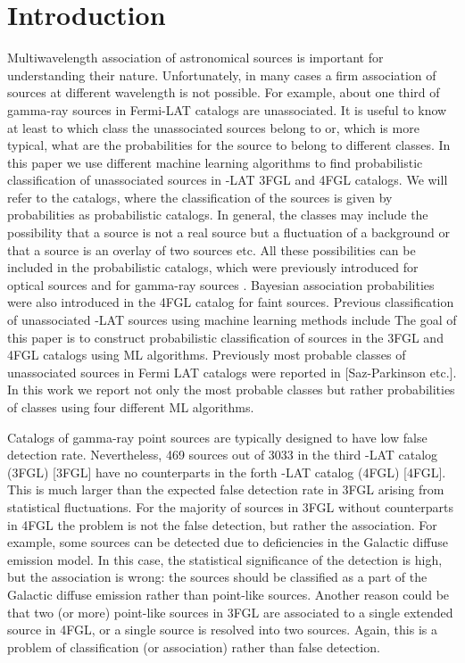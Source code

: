 \section{Introduction}

Multiwavelength association of astronomical sources is important for understanding their nature.
Unfortunately, in many cases a firm association of sources at different wavelength is not possible.
For example, about one third of gamma-ray sources in Fermi-LAT catalogs are unassociated.
It is useful to know at least to which class the unassociated sources belong to or, which is more typical,
what are the probabilities for the source to belong to different classes.
In this paper we use different machine learning algorithms to find probabilistic classification of
unassociated sources in \Fermi-LAT 3FGL \citep{2015ApJS..218...23A} and 4FGL \citep{2020ApJS..247...33A} catalogs.
We will refer to the catalogs, where the classification of the sources is given by probabilities as probabilistic catalogs.
In general, the classes may include the possibility that a source is not a real source but a fluctuation of a background 
or that a source is an overlay of two sources etc.
All these possibilities can be included in the probabilistic catalogs, which were previously introduced for optical sources 
\citep[e.g.,][]{2010EAS....45..351H, 2013AJ....146....7B}
and for gamma-ray sources \citep{2017ApJ...839....4D}.
Bayesian association probabilities were also introduced in the 4FGL catalog \citep{2020ApJS..247...33A} for faint sources.
Previous classification of unassociated \Fermi-LAT sources using machine learning methods include 
The goal of this paper is to construct probabilistic classification of sources in the 3FGL and 4FGL catalogs using ML algorithms.
Previously most probable classes of unassociated sources in Fermi LAT catalogs were reported in
[Saz-Parkinson etc.].
In this work we report not only the most probable classes but rather probabilities of classes using four different ML algorithms.

Catalogs of gamma-ray point sources are typically designed to have low false detection rate. 
Nevertheless, 469 sources out of 3033 in the third \Fermi-LAT catalog (3FGL) [3FGL] have no counterparts 
in the forth \Fermi-LAT catalog (4FGL) [4FGL].
This is much larger than the expected false detection rate in 3FGL arising from statistical fluctuations.
For the majority of sources in 3FGL without counterparts in 4FGL the problem is not the false detection, 
but rather the association.
For example, some sources can be detected due to deficiencies in the Galactic diffuse emission model.
In this case, the statistical significance of the detection is high, but the association is wrong: the sources should be classified as
a part of the Galactic diffuse emission rather than point-like sources.
Another reason could be that two (or more) point-like sources in 3FGL are associated to a single extended source in 4FGL,
or a single source is resolved into two sources.
Again, this is a problem of classification (or association) rather than false detection.

